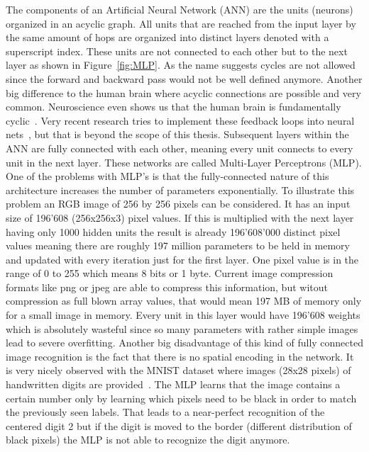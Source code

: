 The components of an Artificial Neural Network (ANN) are the units (neurons) organized in an acyclic graph. All units that are reached from the input layer by the same amount of hops are organized into distinct layers denoted with a superscript index. These units are not connected to each other but to the next layer as shown in Figure~\ref{fig:MLP}. As the name suggests cycles are not allowed since the forward and backward pass would not be well defined anymore. Another big difference to the human brain where acyclic connections are possible and very common. Neuroscience even shows us that the human brain is fundamentally cyclic~\cite{goodale1992separate}. Very recent research tries to implement these feedback loops into neural nets~\cite{caswell2016loopy}, but that is beyond the scope of this thesis. Subsequent layers within the ANN are fully connected with each other, meaning every unit connects to every unit in the next layer. These networks are called Multi-Layer Perceptrons (MLP). One of the problems with MLP's is that the fully-connected nature of this architecture increases the number of parameters exponentially. To illustrate this problem an RGB image of 256 by 256 pixels can be considered. It has an input size of 196'608 (256x256x3) pixel values. If this is multiplied with the next layer having only 1000 hidden units the result is already 196'608'000 distinct pixel values meaning there are roughly 197 million parameters to be held in memory and updated with every iteration just for the first layer. One pixel value is in the range of 0 to 255 which means 8 bits or 1 byte. Current image compression formats like png or jpeg are able to compress this information, but witout compression as full blown array values, that would mean 197 MB of memory only for a small image in memory. Every unit in this layer would have 196'608 weights which is absolutely wasteful since so many parameters with rather simple images lead to severe overfitting. Another big disadvantage of this kind of fully connected image recognition is the fact that there is no spatial encoding in the network. It is very nicely observed with the MNIST dataset where images (28x28 pixels) of handwritten digits are provided~\cite{MNISTdatabase}. The MLP learns that the image contains a certain number only by learning which pixels need to be black in order to match the previously seen labels. That leads to a near-perfect recognition of the centered digit 2 but if the digit is moved to the border (different distribution of black pixels) the MLP is not able to recognize the digit anymore.\\


